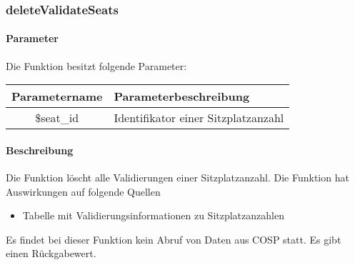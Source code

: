 \subsubsection{deleteValidateSeats}
\paragraph{Parameter} Die Funktion besitzt folgende Parameter:
\begin{table}[H]
	\begin{tabular}{|c|p{11cm}|}
		\hline
		\textbf{Parametername} & \textbf{Parameterbeschreibung} \\ \hline
		\$seat\_id & Identifikator einer Sitzplatzanzahl \\ \hline
	\end{tabular}
\end{table}
\paragraph{Beschreibung} Die Funktion löscht alle Validierungen einer Sitzplatzanzahl. Die Funktion hat Auswirkungen auf folgende Quellen
\begin{itemize}
	\item Tabelle mit Validierungsinformationen zu Sitzplatzanzahlen
\end{itemize}
Es findet bei dieser Funktion kein Abruf von Daten aus {\glqq COSP\grqq} statt. Es gibt einen Rückgabewert.
